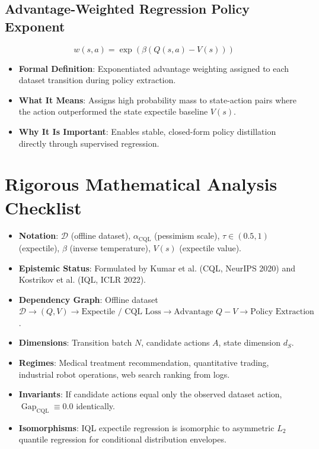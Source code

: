 \documentclass[11pt,a4paper]{article}
\theoremstyle{definition}
\begin{document}
\subsection{Advantage-Weighted Regression Policy Exponent}
{\boldmath
\begin{equation}
w(s, a) = \exp\left( \beta \left( Q(s, a) - V(s) \right) \right)
\end{equation}
}
\begin{itemize}
    \item \textbf{Formal Definition}: Exponentiated advantage weighting assigned to each dataset transition during policy extraction.
    \item \textbf{What It Means}: Assigns high probability mass to state-action pairs where the action outperformed the state expectile baseline $V(s)$.
    \item \textbf{Why It Is Important}: Enables stable, closed-form policy distillation directly through supervised regression.
\end{itemize}

\section{Rigorous Mathematical Analysis Checklist}

\begin{itemize}
    \item \textbf{Notation}: $\mathcal{D}$ (offline dataset), $\alpha_{\text{CQL}}$ (pessimism scale), $\tau \in (0.5, 1)$ (expectile), $\beta$ (inverse temperature), $V(s)$ (expectile value).
    \item \textbf{Epistemic Status}: Formulated by Kumar et al. (CQL, NeurIPS 2020) and Kostrikov et al. (IQL, ICLR 2022).
    \item \textbf{Dependency Graph}: Offline dataset $\mathcal{D} \to (Q, V) \to \text{Expectile / CQL Loss} \to \text{Advantage } Q - V \to \text{Policy Extraction}$.
    \item \textbf{Dimensions}: Transition batch $N$, candidate actions $A$, state dimension $d_S$.
    \item \textbf{Regimes}: Medical treatment recommendation, quantitative trading, industrial robot operations, web search ranking from logs.
    \item \textbf{Invariants}: If candidate actions equal only the observed dataset action, $\operatorname{Gap}_{\text{CQL}} \equiv 0.0$ identically.
    \item \textbf{Isomorphisms}: IQL expectile regression is isomorphic to asymmetric $L_2$ quantile regression for conditional distribution envelopes.
\end{itemize}
\end{document}
